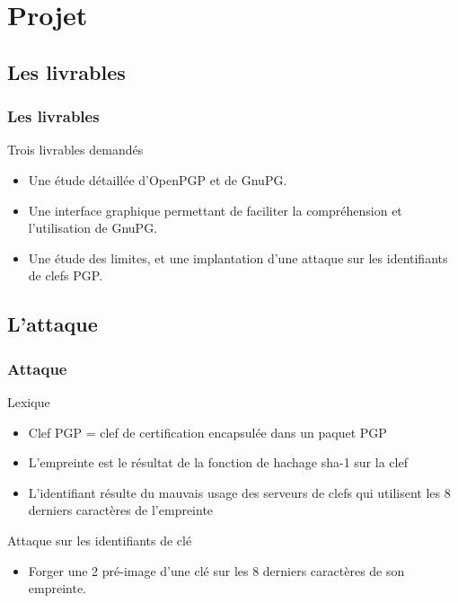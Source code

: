 \section{Projet}
\subsection{Les livrables}
\begin{frame}
    \frametitle{\color{white}Les livrables}
    \begin{block}{Trois livrables demandés}
      \begin{itemize}
         \item Une étude détaillée d'OpenPGP et de GnuPG.
         \item Une interface graphique permettant de faciliter la compréhension et l'utilisation de GnuPG.
         \item Une étude des limites, et une implantation d'une attaque sur les identifiants de clefs PGP.
       \end{itemize} 
    \end{block}
\end{frame}

\subsection{L'attaque}
\begin{frame}
  \frametitle{\color{white}Attaque}
  \begin{block}{Lexique}
    \begin{itemize}
      \item Clef PGP = clef de certification encapsulée dans un paquet PGP
      \item L'empreinte est le résultat de la fonction de hachage sha-1 sur la clef
      \item L'identifiant résulte du mauvais usage des serveurs de clefs qui utilisent les 8 derniers caractères de l'empreinte
    \end{itemize}
    \end{block}
  \begin{block}{Attaque sur les identifiants de clé}
    \begin{itemize}
      \item Forger une 2 pré-image d'une clé sur les 8 derniers caractères de son empreinte.
    \end{itemize}
  \end{block}
\end{frame}

